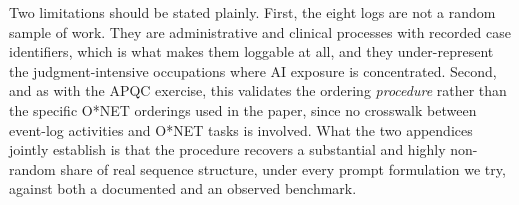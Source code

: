 Two limitations should be stated plainly.
First, the eight logs are not a random sample of work.
They are administrative and clinical processes with recorded case identifiers, which is what makes them
loggable at all, and they under-represent the judgment-intensive occupations where AI exposure is
concentrated.
Second, and as with the APQC exercise, this validates the ordering \emph{procedure} rather than the specific
O*NET orderings used in the paper, since no crosswalk between event-log activities and O*NET tasks is
involved.
What the two appendices jointly establish is that the procedure recovers a substantial and highly
non-random share of real sequence structure, under every prompt formulation we try, against both a
documented and an observed benchmark.
